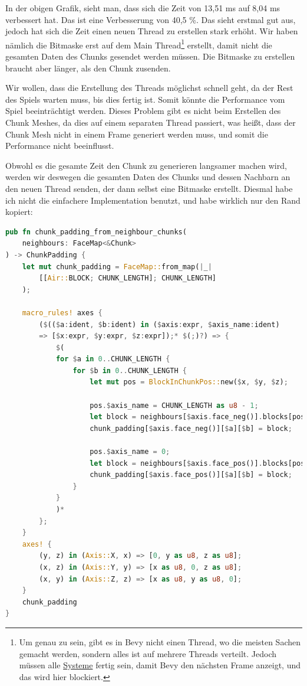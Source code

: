 \vspace{0.3cm}

In der obigen Grafik, sieht man, dass sich die Zeit
von 13,51 ms auf 8,04 ms verbessert hat.
Das ist eine Verbesserung von 40,5 \%.
Das sieht erstmal gut aus,
jedoch hat sich die Zeit einen neuen Thread zu
erstellen stark erhöht. Wir haben nämlich die Bitmaske
erst auf dem Main Thread\footnote{
	Um genau zu sein, gibt es in Bevy
	nicht einen  Thread, wo die meisten Sachen
	gemacht werden, sondern alles ist auf mehrere Threads
	verteilt. Jedoch müssen alle
	\href{https://bevy-cheatbook.github.io/programming/systems.html}{Systeme}
	\cite{bevy_systems} fertig sein, damit Bevy den
	nächsten Frame anzeigt, und das wird hier blockiert.
}
erstellt, damit nicht die
gesamten Daten des Chunks gesendet werden müssen.
Die Bitmaske zu erstellen braucht aber länger,
als den Chunk zusenden.

Wir wollen, dass die Erstellung des Threads möglichst
schnell geht, da der Rest des Spiels warten muss,
bis dies fertig ist. Somit könnte die Performance
vom Spiel beeinträchtigt werden. Dieses Problem gibt
es nicht beim Erstellen des Chunk Meshes, da dies auf
einem separaten Thread passiert, was heißt, dass der
Chunk Mesh nicht in einem Frame generiert werden muss,
und somit die Performance nicht beeinflusst.

Obwohl es die gesamte Zeit den Chunk zu generieren
langsamer machen wird, werden wir deswegen die gesamten
Daten des Chunks und dessen Nachbarn an den neuen
Thread senden, der dann selbst eine Bitmaske erstellt.
Diesmal habe ich nicht die einfachere Implementation
benutzt, und habe wirklich nur den Rand kopiert:

\begin{lstlisting}[language=Rust]
pub fn chunk_padding_from_neighbour_chunks(
	neighbours: FaceMap<&Chunk>
) -> ChunkPadding {
	let mut chunk_padding = FaceMap::from_map(|_|
		[[Air::BLOCK; CHUNK_LENGTH]; CHUNK_LENGTH]
	);

	macro_rules! axes {
		($(($a:ident, $b:ident) in ($axis:expr, $axis_name:ident)
		=> [$x:expr, $y:expr, $z:expr]);* $(;)?) => {
			$(
			for $a in 0..CHUNK_LENGTH {
				for $b in 0..CHUNK_LENGTH {
					let mut pos = BlockInChunkPos::new($x, $y, $z);

					pos.$axis_name = CHUNK_LENGTH as u8 - 1;
					let block = neighbours[$axis.face_neg()].blocks[pos];
					chunk_padding[$axis.face_neg()][$a][$b] = block;

					pos.$axis_name = 0;
					let block = neighbours[$axis.face_pos()].blocks[pos];
					chunk_padding[$axis.face_pos()][$a][$b] = block;
				}
			}
			)*
		};
	}
	axes! {
		(y, z) in (Axis::X, x) => [0, y as u8, z as u8];
		(x, z) in (Axis::Y, y) => [x as u8, 0, z as u8];
		(x, y) in (Axis::Z, z) => [x as u8, y as u8, 0];
	}
	chunk_padding
}
\end{lstlisting}

